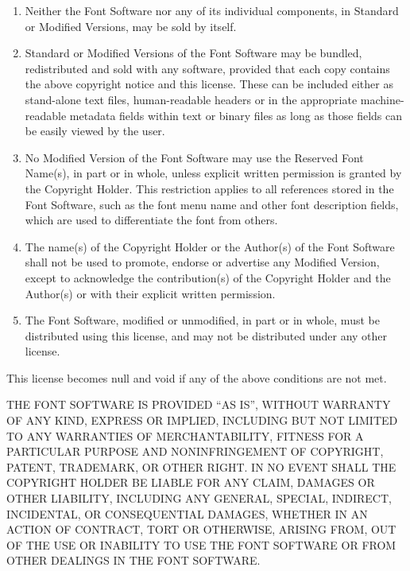 \documentclass{fontdokuold}
\begin{document}
\begin{enumerate}
\item Neither the Font Software nor any of its individual components,
      in Standard or Modified Versions, may be sold by itself.
\item Standard or Modified Versions of the Font Software may be bundled,
      redistributed and sold with any software, provided that each copy
      contains the above copyright notice and this license. These can be
      included either as stand-alone text files, human-readable headers or
      in the appropriate machine-readable metadata fields within text or
      binary files as long as those fields can be easily viewed by the user.
\item No Modified Version of the Font Software may use the Reserved Font
      Name(s), in part or in whole, unless explicit written permission is
      granted by the Copyright Holder. This restriction applies to all
      references stored in the Font Software, such as the font menu name and
      other font description fields, which are used to differentiate the
      font from others.
\item The name(s) of the Copyright Holder or the Author(s) of the Font
      Software shall not be used to promote, endorse or advertise any
      Modified Version, except to acknowledge the contribution(s) of the
      Copyright Holder and the Author(s) or with their explicit written
      permission.
\item The Font Software, modified or unmodified, in part or in whole,
      must be distributed using this license, and may not be distributed
      under any other license.
\end{enumerate}


This license becomes null and void if any of the above conditions are
not met.


THE FONT SOFTWARE IS PROVIDED "`AS IS"', WITHOUT WARRANTY OF ANY KIND,
EXPRESS OR IMPLIED, INCLUDING BUT NOT LIMITED TO ANY WARRANTIES OF
MERCHANTABILITY, FITNESS FOR A PARTICULAR PURPOSE AND NONINFRINGEMENT
OF COPYRIGHT, PATENT, TRADEMARK, OR OTHER RIGHT. IN NO EVENT SHALL THE
COPYRIGHT HOLDER BE LIABLE FOR ANY CLAIM, DAMAGES OR OTHER LIABILITY,
INCLUDING ANY GENERAL, SPECIAL, INDIRECT, INCIDENTAL, OR CONSEQUENTIAL
DAMAGES, WHETHER IN AN ACTION OF CONTRACT, TORT OR OTHERWISE, ARISING
FROM, OUT OF THE USE OR INABILITY TO USE THE FONT SOFTWARE OR FROM
OTHER DEALINGS IN THE FONT SOFTWARE.

\end{document}
